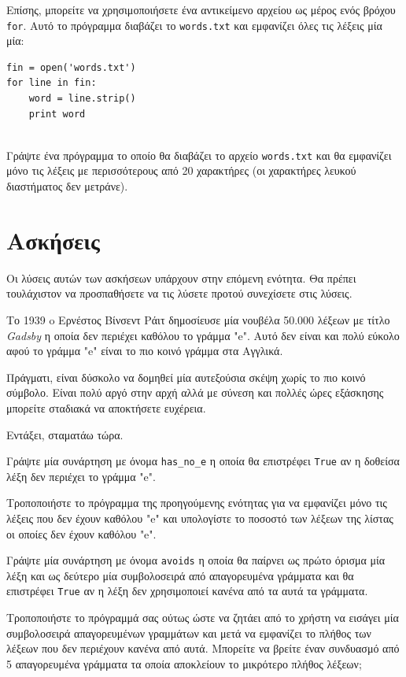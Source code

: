 \documentclass[10pt]{book}
\begin{document}
Επίσης, μπορείτε να χρησιμοποιήσετε ένα αντικείμενο αρχείου ως μέρος ενός βρόχου {\tt for}. Αυτό το πρόγραμμα διαβάζει το {\tt words.txt} και εμφανίζει όλες τις λέξεις μία μία:

\begin{verbatim}
fin = open('words.txt')
for line in fin:
    word = line.strip()
    print word
    
\end{verbatim}
%

\begin{exercise}

Γράψτε ένα πρόγραμμα το οποίο θα διαβάζει το αρχείο {\tt words.txt} και θα εμφανίζει μόνο τις λέξεις με περισσότερους από 20 χαρακτήρες (οι χαρακτήρες λευκού διαστήματος δεν μετράνε).
\end{exercise}


\section{Ασκήσεις}

Οι λύσεις αυτών των ασκήσεων υπάρχουν στην επόμενη ενότητα. Θα πρέπει τουλάχιστον να προσπαθήσετε να τις λύσετε προτού συνεχίσετε στις λύσεις.
\\

\begin{exercise}

Το 1939 o Ερνέστος Βίνσεντ Ράιτ δημοσίευσε μία νουβέλα 50.000 λέξεων με τίτλο  {\em Gadsby} η οποία δεν περιέχει καθόλου το γράμμα "e". Αυτό δεν είναι και πολύ εύκολο αφού το γράμμα "e" είναι το πιο κοινό γράμμα στα Αγγλικά.

Πράγματι, είναι δύσκολο να δομηθεί μία αυτεξούσια σκέψη χωρίς το πιο κοινό σύμβολο. Είναι πολύ αργό στην αρχή αλλά με σύνεση και πολλές ώρες εξάσκησης μπορείτε σταδιακά να αποκτήσετε ευχέρεια.

Εντάξει, σταματάω τώρα.

Γράψτε μία συνάρτηση με όνομα \verb"has_no_e" η οποία θα επιστρέφει {\tt True}  αν η δοθείσα λέξη δεν περιέχει το γράμμα "e". 

Τροποποιήστε το πρόγραμμα της προηγούμενης ενότητας για να εμφανίζει μόνο τις λέξεις που δεν έχουν καθόλου "e" και υπολογίστε το ποσοστό των λέξεων της λίστας οι οποίες δεν έχουν καθόλου "e".
\\
\end{exercise}


\begin{exercise}

Γράψτε μία συνάρτηση με όνομα {\tt avoids} η οποία θα παίρνει ως πρώτο όρισμα μία λέξη και ως δεύτερο μία συμβολοσειρά από απαγορευμένα γράμματα και θα επιστρέφει {\tt True} αν η λέξη δεν χρησιμοποιεί κανένα από τα αυτά τα γράμματα.

Τροποποιήστε το πρόγραμμά σας ούτως ώστε να ζητάει από το χρήστη να εισάγει μία συμβολοσειρά απαγορευμένων γραμμάτων και μετά να εμφανίζει το πλήθος των λέξεων που δεν περιέχουν κανένα από αυτά. Μπορείτε να βρείτε έναν συνδυασμό από 5 απαγορευμένα γράμματα τα οποία αποκλείουν το μικρότερο πλήθος λέξεων;
\\
\end{exercise}
\end{document}
